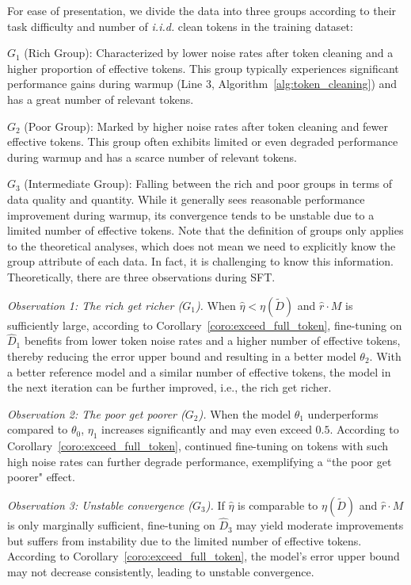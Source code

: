 For ease of presentation, we divide the data into three groups according to their task difficulty and number of \textit{i.i.d.} clean tokens in the training dataset:
\squishlist \item $G_1$ (Rich Group): Characterized by lower noise rates after token cleaning and a higher proportion of effective tokens. This group typically experiences significant performance gains during warmup (Line 3, Algorithm~\ref{alg:token_cleaning}) and has a great number of relevant tokens.
\item $G_2$ (Poor Group): Marked by higher noise rates after token cleaning and fewer effective tokens. This group often exhibits limited or even degraded performance during warmup and has a scarce number of relevant tokens.
\item $G_3$ (Intermediate Group): Falling between the rich and poor groups in terms of data quality and quantity. While it generally sees reasonable performance improvement during warmup, its convergence tends to be unstable due to a limited number of effective tokens.
\squishend
Note that the definition of groups only applies to the theoretical analyses, which does not mean we need to explicitly know the group attribute of each data. In fact, it is challenging to know this information.
Theoretically, there are three observations during SFT.

\squishlist
\item\textit{Observation 1: The rich get richer ($G_1$).} When $\hat\eta < \eta({\widetilde{D}})$ and $\hat r \cdot M$ is sufficiently large, according to Corollary~\ref{coro:exceed_full_token}, fine-tuning on $\widehat{D}_1$ benefits from lower token noise rates and a higher number of effective tokens, thereby reducing the error upper bound and resulting in a better model $\theta_2$. With a better reference model and a similar number of effective tokens, the model in the next iteration can be further improved, i.e., the rich get richer.

\item\textit{Observation 2: The poor get poorer ($G_2$).} 
When the model $\theta_{1}$ underperforms compared to $\theta_{0}$, $\eta_1$ increases significantly and may even exceed $0.5$. According to Corollary~\ref{coro:exceed_full_token}, continued fine-tuning on tokens with such high noise rates can further degrade performance, exemplifying a ``the poor get poorer" effect.

\item\textit{Observation 3: Unstable convergence ($G_3$).} 
If $\hat\eta$ is comparable to $\eta({\widetilde{D}})$ and $\hat r \cdot M$ is only marginally sufficient, fine-tuning on $\widehat{D}_3$ may yield moderate improvements but suffers from instability due to the limited number of effective tokens.
According to Corollary~\ref{coro:exceed_full_token}, the model's error upper bound may not decrease consistently, leading to unstable convergence.
\squishend







